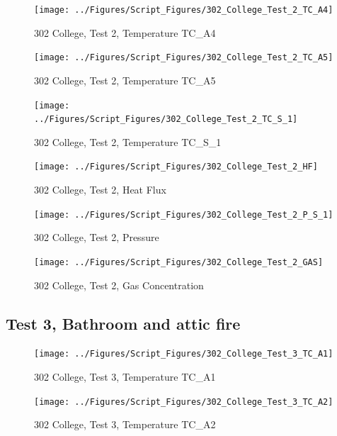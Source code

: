 \documentclass[12pt,oneside]{book}
\begin{document}
\begin{figure}[!ht]
\texttt{[image: ../Figures/Script\_Figures/302\_College\_Test\_2\_TC\_A4]}
\caption{302 College, Test 2, Temperature TC\_A4}
\label{fig:302_College_Test_2_TC_A4}
\end{figure}

\begin{figure}[!ht]
\texttt{[image: ../Figures/Script\_Figures/302\_College\_Test\_2\_TC\_A5]}
\caption{302 College, Test 2, Temperature TC\_A5}
\label{fig:302_College_Test_2_TC_A5}
\end{figure}

\begin{figure}[!ht]
\texttt{[image: ../Figures/Script\_Figures/302\_College\_Test\_2\_TC\_S\_1]}
\caption{302 College, Test 2, Temperature TC\_S\_1}
\label{fig:302_College_Test_2_TC_S_1}
\end{figure}

\begin{figure}[!ht]
\texttt{[image: ../Figures/Script\_Figures/302\_College\_Test\_2\_HF]}
\caption{302 College, Test 2, Heat Flux}
\label{fig:302_College_Test_2_HF}
\end{figure}

\begin{figure}[!ht]
\texttt{[image: ../Figures/Script\_Figures/302\_College\_Test\_2\_P\_S\_1]}
\caption{302 College, Test 2, Pressure}
\label{fig:302_College_Test_2_P_S_1}
\end{figure}

\begin{figure}[!ht]
\texttt{[image: ../Figures/Script\_Figures/302\_College\_Test\_2\_GAS]}
\caption{302 College, Test 2, Gas Concentration}
\label{fig:302_College_Test_2_GAS}
\end{figure}


\clearpage


\subsection{Test 3, Bathroom and attic fire}

\begin{figure}[!ht]
\texttt{[image: ../Figures/Script\_Figures/302\_College\_Test\_3\_TC\_A1]}
\caption{302 College, Test 3, Temperature TC\_A1}
\label{fig:302_College_Test_3_TC_A1}
\end{figure}

\begin{figure}[!ht]
\texttt{[image: ../Figures/Script\_Figures/302\_College\_Test\_3\_TC\_A2]}
\caption{302 College, Test 3, Temperature TC\_A2}
\label{fig:302_College_Test_3_TC_A2}
\end{figure}
\end{document}
